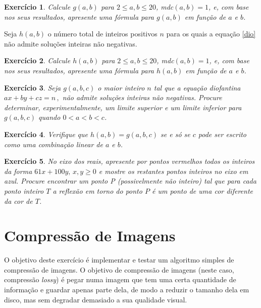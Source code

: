 \documentclass{article}
\newtheorem{ex}{Exercício}[section]
\begin{document}
\begin{ex}
Calcule $g(a,b)$ para $2\leq a,b\leq 20$, mdc$(a,b)=1$, e, com base nos seus resultados, apresente uma fórmula para  $g(a,b)$ em função de $a$ e $b$.
\end{ex}


Seja $h(a,b)$ o número total de  inteiros positivos $n$ para os quais a equação \eqref{dio}  não admite soluções inteiras não negativas.

\begin{ex}
Calcule $h(a,b)$ para $2\leq a,b\leq 20$, mdc$(a,b)=1$, e, com base nos seus resultados, apresente uma fórmula para $h(a,b)$ em função de $a$ e $b$.
\end{ex}

\begin{ex}
Seja $g(a,b,c)$ o maior inteiro $n$ tal que a equação
diofantina
$
ax+by+cz=n \,  ,
$
 não admite soluções inteiras não negativas. Procure determinar, experimentalmente, um limite superior e um limite inferior para $g(a,b,c)$ quando $0<a<b<c$.
\end{ex}

\begin{ex}
Verifique que $h(a,b) = g(a,b,c)$ se e só se  $c$ pode ser escrito como uma combinação linear de $a$ e $b$.
\end{ex}

\begin{ex}
No eixo dos reais, apresente por pontos vermelhos todos os inteiros da forma $61x+100y, \, x,y\geq0$ e mostre os restantes pontos inteiros no eixo em azul.
Procure encontrar um ponto P (possivelmente não inteiro) tal que para cada ponto inteiro $T$ a reflexão em torno do ponto $P$ \'e um ponto de uma cor diferente da cor de $T$.
\end{ex}

\section{Compressão de Imagens}

O objetivo deste exercício é implementar e testar um algoritmo simples de compressão de imagens. O objetivo de compressão de imagens (neste caso, compressão \textit{lossy}) é pegar numa imagem que tem uma certa quantidade de informação e guardar apenas parte dela, de modo a reduzir o tamanho dela em disco, mas sem degradar demasiado a sua qualidade visual.
\end{document}

